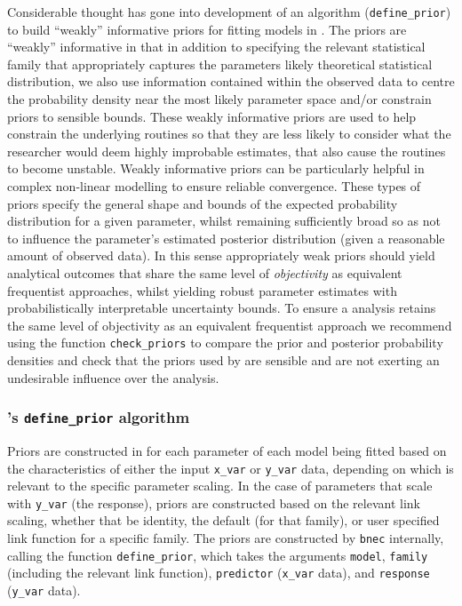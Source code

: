 \documentclass[
]{jss}
\begin{document}
Considerable thought has gone into development of an algorithm
(\texttt{define\_prior}) to build ``weakly'' informative priors for
fitting models in . The priors are ``weakly'' informative
in that in addition to specifying the relevant statistical family that
appropriately captures the parameters likely theoretical statistical
distribution, we also use information contained within the observed data
to centre the probability density near the most likely parameter space
and/or constrain priors to sensible bounds. These weakly informative
priors are used to help constrain the underlying routines so that they
are less likely to consider what the researcher would deem highly
improbable estimates, that also cause the routines to become unstable.
Weakly informative priors can be particularly helpful in complex
non-linear modelling to ensure reliable convergence. These types of
priors specify the general shape and bounds of the expected probability
distribution for a given parameter, whilst remaining sufficiently broad
so as not to influence the parameter's estimated posterior distribution
(given a reasonable amount of observed data). In this sense
appropriately weak priors should yield analytical outcomes that share
the same level of \emph{objectivity} as equivalent frequentist
approaches, whilst yielding robust parameter estimates with
probabilistically interpretable uncertainty bounds. To ensure a
 analysis retains the same level of objectivity as an
equivalent frequentist approach we recommend using the function
\texttt{check\_priors} to compare the prior and posterior probability
densities and check that the priors used by  are sensible
and are not exerting an undesirable influence over the analysis.

\subsubsection[bayesnec's define_prior algorithm]{'s
\texttt{define\_prior} algorithm}\label{s-define_prior-algorithm}

Priors are constructed in  for each parameter of each
model being fitted based on the characteristics of either the input
\texttt{x\_var} or \texttt{y\_var} data, depending on which is relevant
to the specific parameter scaling. In the case of parameters that scale
with \texttt{y\_var} (the response), priors are constructed based on the
relevant link scaling, whether that be identity, the default (for that
family), or user specified link function for a specific family. The
priors are constructed by \texttt{bnec} internally, calling the function
\texttt{define\_prior}, which takes the arguments \texttt{model},
\texttt{family} (including the relevant link function),
\texttt{predictor} (\texttt{x\_var} data), and \texttt{response}
(\texttt{y\_var} data).
\end{document}
